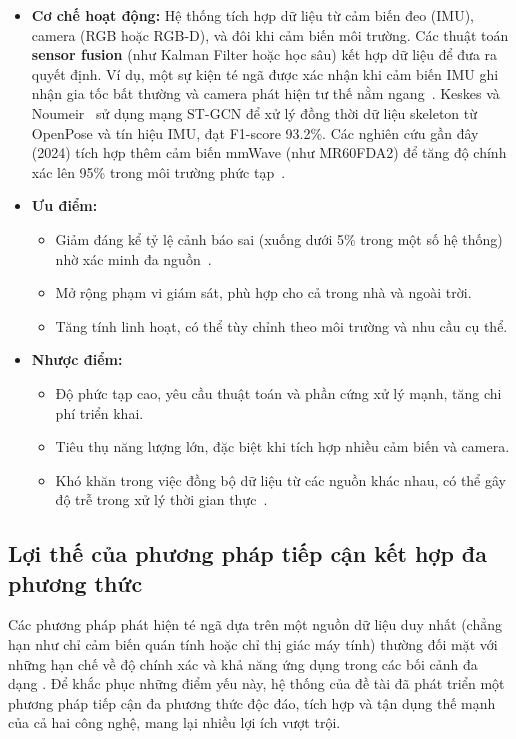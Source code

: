 \begin{itemize}
    \item \textbf{Cơ chế hoạt động:} Hệ thống tích hợp dữ liệu từ cảm biến đeo (IMU), camera (RGB hoặc RGB-D), và đôi khi cảm biến môi trường. Các thuật toán \textbf{sensor fusion} (như Kalman Filter hoặc học sâu) kết hợp dữ liệu để đưa ra quyết định. Ví dụ, một sự kiện té ngã được xác nhận khi cảm biến IMU ghi nhận gia tốc bất thường và camera phát hiện tư thế nằm ngang~\cite{rougier2011}. Keskes và Noumeir~\cite{keskes2021} sử dụng mạng ST-GCN để xử lý đồng thời dữ liệu skeleton từ OpenPose và tín hiệu IMU, đạt F1-score 93.2\%. Các nghiên cứu gần đây (2024) tích hợp thêm cảm biến mmWave (như MR60FDA2) để tăng độ chính xác lên 95\% trong môi trường phức tạp~\cite{mmwave2025}.
    \item \textbf{Ưu điểm:} 
    \begin{itemize}
        \item Giảm đáng kể tỷ lệ cảnh báo sai (xuống dưới 5\% trong một số hệ thống) nhờ xác minh đa nguồn~\cite{multimodal2024}.
        \item Mở rộng phạm vi giám sát, phù hợp cho cả trong nhà và ngoài trời.
        \item Tăng tính linh hoạt, có thể tùy chỉnh theo môi trường và nhu cầu cụ thể.
    \end{itemize}
    \item \textbf{Nhược điểm:}
    \begin{itemize}
        \item Độ phức tạp cao, yêu cầu thuật toán và phần cứng xử lý mạnh, tăng chi phí triển khai.
        \item Tiêu thụ năng lượng lớn, đặc biệt khi tích hợp nhiều cảm biến và camera.
        \item Khó khăn trong việc đồng bộ dữ liệu từ các nguồn khác nhau, có thể gây độ trễ trong xử lý thời gian thực~\cite{liu2018}.
    \end{itemize}
\end{itemize}

\subsection{Lợi thế của phương pháp tiếp cận kết hợp đa phương thức}
Các phương pháp phát hiện té ngã dựa trên một nguồn dữ liệu duy nhất (chẳng hạn như chỉ cảm biến quán tính hoặc chỉ thị giác máy tính) thường đối mặt với những hạn chế về độ chính xác và khả năng ứng dụng trong các bối cảnh đa dạng \cite{researchgate_hybrid}. Để khắc phục những điểm yếu này, hệ thống của đề tài đã phát triển một phương pháp tiếp cận đa phương thức độc đáo, tích hợp và tận dụng thế mạnh của cả hai công nghệ, mang lại nhiều lợi ích vượt trội.

